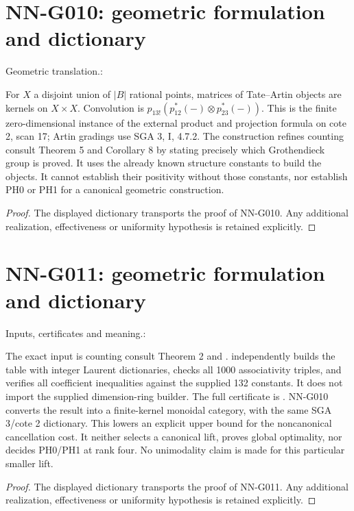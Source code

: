 \section{NN-G010: geometric formulation and dictionary}
\begin{geometricstatement}[NN-G010]
Geometric translation.:

For $X$ a disjoint union of $|B|$ rational points, matrices of
Tate--Artin objects are kernels on $X\times X$. Convolution is
$p_{13!}(p_{12}^*(-)\otimes p_{23}^*(-))$. This is the finite
zero-dimensional instance of the external product and projection
formula on cote 2, scan 17; Artin gradings use SGA 3, I, 4.7.2.
The construction refines counting consult Theorem 5 and
Corollary 8 by stating precisely which Grothendieck group is
proved. It uses the already known structure constants to build
the objects. It cannot establish their positivity without those
constants, nor establish PH0 or PH1 for a canonical geometric
construction.


\end{geometricstatement}
\begin{proof} The displayed dictionary transports the proof of NN-G010. Any additional realization, effectiveness or uniformity hypothesis is retained explicitly.\end{proof}


\section{NN-G011: geometric formulation and dictionary}
\begin{geometricstatement}[NN-G011]
Inputs, certificates and meaning.:

The exact input is counting consult Theorem 2 and
.
 independently builds the
table with integer Laurent dictionaries, checks all 1000
associativity triples, and verifies all coefficient inequalities
against the supplied 132 constants. It does not import the
supplied dimension-ring builder. The full certificate is
.
NN-G010 converts the result into a finite-kernel monoidal
category, with the same SGA 3/cote 2 dictionary. This lowers
an explicit upper bound for the noncanonical cancellation
cost. It neither selects a canonical lift, proves global
optimality, nor decides PH0/PH1 at rank four. No unimodality
claim is made for this particular smaller lift.


\end{geometricstatement}
\begin{proof} The displayed dictionary transports the proof of NN-G011. Any additional realization, effectiveness or uniformity hypothesis is retained explicitly.\end{proof}



